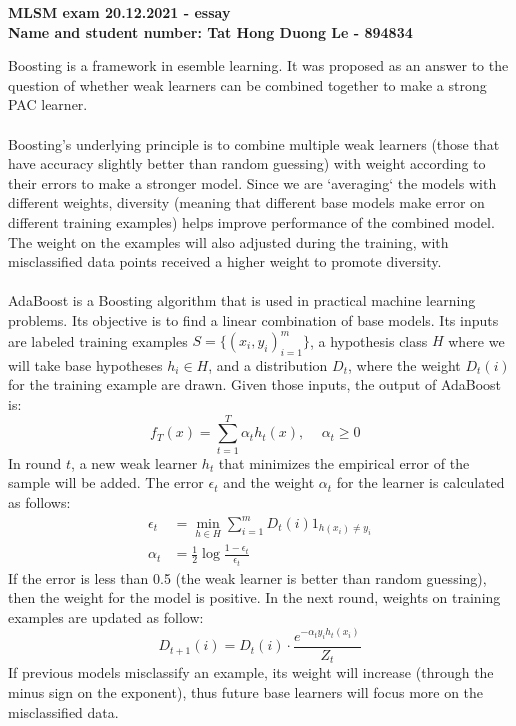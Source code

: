 \documentclass[12pt,a4paper]{article}
\begin{document}
\textbf{MLSM exam 20.12.2021 - essay \\ Name and student number: Tat Hong Duong Le - 894834 }



Boosting is a framework in esemble learning. It was proposed as an answer to the question of whether weak learners can be combined together to make a strong PAC learner. \\\\
Boosting's underlying principle is to combine multiple weak learners (those that have accuracy slightly better than random guessing) with weight according to their errors to make a stronger model. Since we are `averaging` the models with different weights, diversity (meaning that different base models make error on different training examples) helps improve performance of the combined model. The weight on the examples will also adjusted during the training, with misclassified data points received a higher weight to promote diversity. \\\\
AdaBoost is a Boosting algorithm that is used in practical machine learning problems. Its objective is to find a linear combination of base models. Its inputs are labeled training examples $S = \{(x_i, y_i)^{m}_{i=1}\}$, a hypothesis class $H$ where we will take base hypotheses $h_i \in H$, and a distribution $D_t$, where the weight $D_t(i)$ for the training example are drawn. Given those inputs, the output of AdaBoost is:
\[
f_T(x) = \sum_{t=1}^{T}{\alpha _t h_t(x)} \text{, $\quad  \alpha _t \geq 0$ }
\]
In round $t$, a new weak learner $h_t$ that minimizes the empirical error of the sample will be added. The error $\epsilon _t$ and the weight $\alpha _t$ for the learner is calculated as follows:
\[
\begin{aligned}
\epsilon _t &= \min_{h \in H} \sum_{i=1}^{m}D_t(i)1_{h(x_i) \neq y_i} \\
\alpha_t &= \frac{1}{2}\log{\frac{1-\epsilon _t}{\epsilon _t}}
\end{aligned}
\]
If the error is less than 0.5 (the weak learner is better than random guessing), then the weight for the model is positive. In the next round, weights on training examples are updated as follow:
\[
D_{t+1}(i) = D_t(i) \cdot \frac{e^{-\alpha _ty_ih_t(x_i)}}{Z_t} 
\]
If previous models misclassify an example, its weight will increase (through the minus sign on the exponent), thus future base learners will focus more on the misclassified data. \\\\
\end{document}
